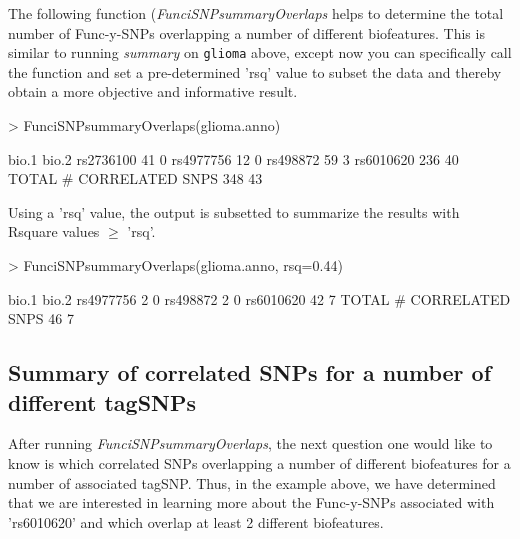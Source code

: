 \documentclass[12pt,fullpage]{article}
\newcommand{\Robject}[1]{{\texttt{#1}}}
\newcommand{\Rmethod}[1]{{\textit{#1}}}
\begin{document}
The following function (\Rmethod{FunciSNPsummaryOverlaps} helps to determine the
total number of Func-y-SNPs overlapping a number of different biofeatures. This
is similar to running \Rmethod{summary} on \Robject{glioma} above, except now
you can specifically call the function and set a pre-determined 'rsq' value to
subset the data and thereby obtain a more objective and informative result.

\begin{Schunk}
\begin{Sinput}
> FunciSNPsummaryOverlaps(glioma.anno)
\end{Sinput}
\begin{Soutput}
                        bio.1 bio.2
rs2736100                  41     0
rs4977756                  12     0
rs498872                   59     3
rs6010620                 236    40
TOTAL # CORRELATED SNPS   348    43
\end{Soutput}
\end{Schunk}

Using a 'rsq' value, the output is subsetted to summarize the results with 
Rsquare values $\ge$ 'rsq'.

\begin{Schunk}
\begin{Sinput}
> FunciSNPsummaryOverlaps(glioma.anno, rsq=0.44)
\end{Sinput}
\begin{Soutput}
                        bio.1 bio.2
rs4977756                   2     0
rs498872                    2     0
rs6010620                  42     7
TOTAL # CORRELATED SNPS    46     7
\end{Soutput}
\end{Schunk}

\subsection{Summary of correlated SNPs for a number of different tagSNPs}

After running \Rmethod{FunciSNPsummaryOverlaps}, the next question one would
like to know is which correlated SNPs overlapping a number of different
biofeatures for a number of associated tagSNP. Thus, in the example above, we
have determined that we are interested in learning more about the Func-y-SNPs
associated with 'rs6010620' and which overlap at least 2 different biofeatures.
\end{document}
